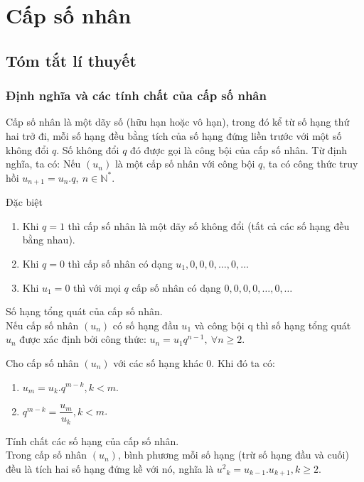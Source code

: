 \section{Cấp số nhân}
\subsection{Tóm tắt lí thuyết}
\subsubsection{Định nghĩa và các tính chất của cấp số nhân}
\begin{dn}
Cấp số nhân là một dãy số (hữu hạn hoặc vô hạn), trong đó kể từ số hạng thứ hai trở đi, mỗi số hạng đều bằng tích của số hạng đứng liền trước với một số không đổi $q$. 
Số không đổi $q$ đó được gọi là công bội của cấp số nhân. Từ định nghĩa, ta có: Nếu $(u_n)$ là một cấp số nhân với công bội $q$, ta có công thức truy hồi $u_{n+1}=u_n. q, \ n \in {\mathbb{N}}^{*}$.
\end{dn}
\begin{note}
	Đặc biệt
	\begin{enumerate}
		\item Khi $q=1$ thì cấp số nhân là một dãy số không đổi (tất cả các số hạng đều bằng nhau). 
		\item Khi $q=0$ thì cấp số nhân có dạng $u_1, 0,0, 0, \ldots, 0, \ldots $ 
		\item Khi $u_1=0$ thì với mọi $q$ cấp số nhân có dạng $0,0, 0,0, \ldots, 0, \ldots $ 
	\end{enumerate}
\end{note}
\begin{dl}
	Số hạng tổng quát của cấp số nhân.\\
	Nếu cấp số nhân $(u_n)$ có số hạng đầu $u_1$ và công bội q  thì số hạng tổng quát $u_n$ được xác định bởi công thức: $u_n=u_1q^{n-1}, \ \forall n\ge 2$.
\end{dl}
\begin{hq}
Cho cấp số nhân $(u_n)$ với các số hạng khác $0$. Khi đó ta có:
\begin{enumerate}
	\item $u_m=u_k. q^{m-k}, k<m $.
    \item $q^{m-k}= \dfrac{u_m}{u_k}, k<m $. 
\end{enumerate} 
\end{hq}
\begin{dl}
Tính chất các số hạng của cấp số nhân.\\
Trong cấp số nhân $(u_n)$, bình phương mỗi số hạng (trừ số hạng đầu và cuối) đều là tích hai số hạng đứng kề với nó, nghĩa là
${u^2}_k=u_{k-1}. u_{k+1}, k\ge 2$.
\end{dl}
